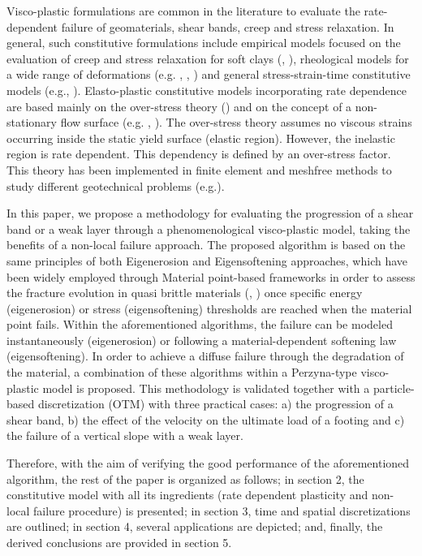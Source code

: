 \documentclass[applsci,journal,article,submit,moreauthors,pdftex]{Definitions/mdpi}
\begin{document}
Visco-plastic formulations are common in the literature to evaluate the rate-dependent failure of geomaterials, shear bands, creep and stress relaxation. In general, such constitutive formulations include empirical models focused on the evaluation of creep and stress relaxation for soft clays (\cite{Bjerrum1967}, \cite{Kim2001}), rheological models for a wide range of deformations (e.g. \cite{Feda}, \cite{Dutto2017}, \cite{Manzanal2015}) and general stress-strain-time constitutive models (e.g.\cite{ADACHI1974}, \cite{HEERES20021}). Elasto-plastic constitutive models incorporating rate dependence are based mainly on the over-stress theory (\cite{Perzyna:66}) and on the concept of a non-stationary flow surface (e.g. \cite{Naghdi1963}, \cite{Nova1982}). The over-stress theory assumes no viscous strains occurring inside the static yield surface (elastic region). However, the inelastic region is rate dependent. This dependency is defined by an over-stress factor. This theory has been implemented in finite element and meshfree methods to study different geotechnical problems (e.g.\cite{Manzanal2015,BlancPastor2012}).  

In this paper, we propose a methodology for evaluating the progression of a shear band or a weak layer through a phenomenological visco-plastic model, taking the benefits of a non-local failure approach. The proposed algorithm is based on the same principles of both Eigenerosion and Eigensoftening approaches, which have been widely employed through Material point-based frameworks in order to assess the fracture evolution in quasi brittle materials (\cite{Navas2018a}, \cite{Molinos2020b}) once specific energy (eigenerosion) or stress (eigensoftening) thresholds are reached when the material point fails. Within the aforementioned algorithms, the failure can be modeled instantaneously (eigenerosion) or following a material-dependent softening law (eigensoftening). In order to achieve a diffuse failure through the degradation of the material, a combination of these algorithms within a Perzyna-type visco-plastic model is proposed. This methodology is validated together with a particle-based discretization (OTM) with three practical cases: a) the progression of a shear band, b) the effect of the velocity on the ultimate load of a footing and c) the failure of a vertical slope with a weak layer. 

Therefore, with the aim of verifying the good performance of the aforementioned algorithm, the rest of the paper is organized as follows; in section 2, the constitutive model with all its ingredients (rate dependent plasticity and non-local failure procedure) is presented; in section 3, time and spatial discretizations are outlined; in section 4, several applications are depicted; and, finally, the derived conclusions are provided in section 5.
\end{document}
